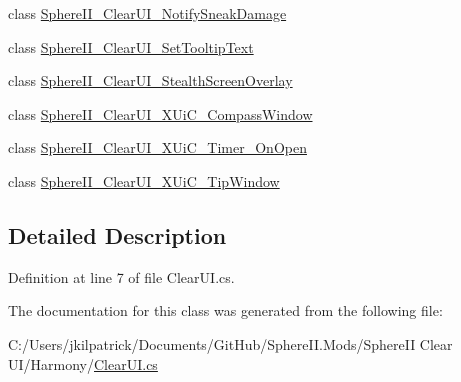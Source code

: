 \begin{DoxyCompactItemize}
\item 
class \mbox{\hyperlink{class_clear_u_i_1_1_sphere_i_i___clear_u_i___notify_sneak_damage}{Sphere\+I\+I\+\_\+\+Clear\+U\+I\+\_\+\+Notify\+Sneak\+Damage}}
\item 
class \mbox{\hyperlink{class_clear_u_i_1_1_sphere_i_i___clear_u_i___set_tooltip_text}{Sphere\+I\+I\+\_\+\+Clear\+U\+I\+\_\+\+Set\+Tooltip\+Text}}
\item 
class \mbox{\hyperlink{class_clear_u_i_1_1_sphere_i_i___clear_u_i___stealth_screen_overlay}{Sphere\+I\+I\+\_\+\+Clear\+U\+I\+\_\+\+Stealth\+Screen\+Overlay}}
\item 
class \mbox{\hyperlink{class_clear_u_i_1_1_sphere_i_i___clear_u_i___x_ui_c___compass_window}{Sphere\+I\+I\+\_\+\+Clear\+U\+I\+\_\+\+X\+Ui\+C\+\_\+\+Compass\+Window}}
\item 
class \mbox{\hyperlink{class_clear_u_i_1_1_sphere_i_i___clear_u_i___x_ui_c___timer___on_open}{Sphere\+I\+I\+\_\+\+Clear\+U\+I\+\_\+\+X\+Ui\+C\+\_\+\+Timer\+\_\+\+On\+Open}}
\item 
class \mbox{\hyperlink{class_clear_u_i_1_1_sphere_i_i___clear_u_i___x_ui_c___tip_window}{Sphere\+I\+I\+\_\+\+Clear\+U\+I\+\_\+\+X\+Ui\+C\+\_\+\+Tip\+Window}}
\end{DoxyCompactItemize}


\subsection{Detailed Description}


Definition at line 7 of file Clear\+U\+I.\+cs.



The documentation for this class was generated from the following file\+:\begin{DoxyCompactItemize}
\item 
C\+:/\+Users/jkilpatrick/\+Documents/\+Git\+Hub/\+Sphere\+I\+I.\+Mods/\+Sphere\+I\+I Clear U\+I/\+Harmony/\mbox{\hyperlink{_clear_u_i_8cs}{Clear\+U\+I.\+cs}}\end{DoxyCompactItemize}
